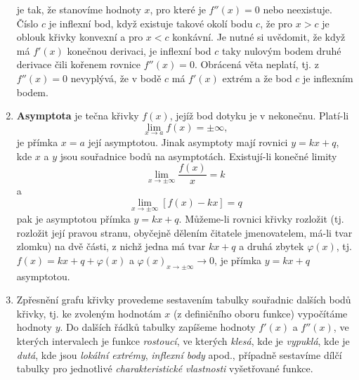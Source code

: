 \begin{enumerate}
            je tak, že stanovíme hodnoty $x$, pro které je $f''(x)=0$ nebo neexistuje. Číslo $c$ je 
            inflexní bod, když existuje takové okolí bodu $c$, že pro $x>c$ je oblouk křivky 
            konvexní a pro $x<c$ konkávní. Je nutné si uvědomit, že když má $f'(x)$ konečnou 
            derivaci, je inflexní bod $c$ taky nulovým bodem druhé derivace čili kořenem rovnice 
            $f''(x)=0$. Obrácená věta neplatí, tj. z $f''(x)=0$ nevyplývá, že v bodě $c$ má $f'(x)$ 
            extrém a že bod $c$ je inflexním bodem.
      \item \textbf{Asymptota} je tečna křivky $f(x)$, jejíž bod dotyku je v nekonečnu. Platí-li  
            $$\lim_{x \to a}f(x) =  \pm\infty,$$ je přímka $x=a$ její asymptotou. Jinak asymptoty 
            mají rovnici $y=kx+q$, kde $x$ a $y$ jsou souřadnice bodů na asymptotách. Existují-li 
            konečné limity $$\lim_{x \to \pm\infty}\frac{f(x)}{x}=k$$  a $$\lim_{x \to 
            \pm\infty}[f(x)-kx] =q$$ pak je asymptotou přímka $y=kx+q$. Můžeme-li rovnici křivky 
            rozložit (tj. rozložit její pravou stranu, oby\-čejně dělením čitatele jmenovatelem, 
            má-li tvar zlomku) na dvě části, z nichž jedna má tvar $kx+q$ a druhá zbytek 
            $\varphi(x)$, tj. $f(x)=kx+q+\varphi(x)$ a $\varphi(x)_{x\rightarrow 
            \pm\infty}\rightarrow 0$, je přímka $y=kx+q$ asymptotou.
      \item Zpřesnění grafu křivky provedeme sestavením tabulky souřadnic dalších bodů křivky,  
            tj. ke zvoleným hodnotám $x$ (z definičního oboru funkce) vypočítáme hodnoty $y$. Do 
            dalších řádků tabulky zapíšeme hodnoty  $f'(x)$ a $f''(x)$, ve kterých intervalech je 
            funkce \emph{rostoucí}, ve kterých \emph{klesá}, kde je \emph{vypuklá}, kde je 
            \emph{dutá}, kde jsou \emph{lokální extrémy}, \emph{inflexní body} apod., 
            případně sestavíme dílčí tabulky pro jednotlivé \emph{charakteristické vlastnosti} vyšetřované funkce.
    \end{enumerate}
    

\printbibliography[heading=subbibliography]

